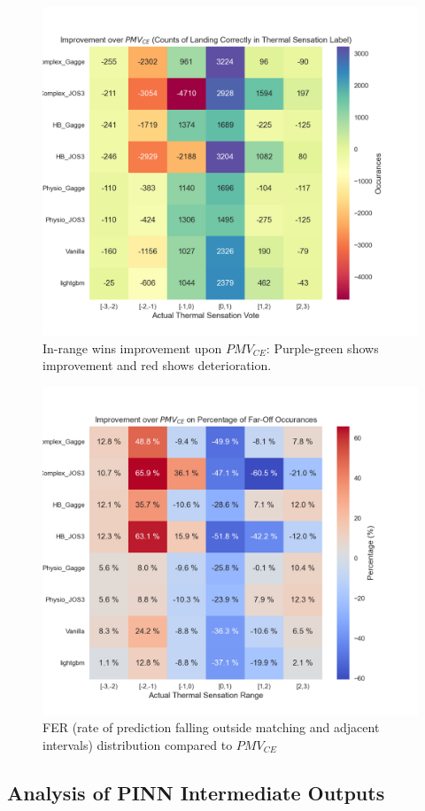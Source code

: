 \begin{figure}[htbp]
    \centering
    \includegraphics[width=0.75\linewidth]{figures/Improve_Count_PMV.png}
    \caption{In-range wins improvement upon $PMV_{CE}$: Purple-green shows improvement and red shows deterioration.}
    \label{fig:enter-label}
\end{figure}
\begin{figure}[htbp]
    \centering
    \includegraphics[width=0.75\linewidth]{figures/FOff_Mods_Perc.png}
    \caption{FER (rate of prediction falling outside matching and adjacent intervals) distribution compared to $PMV_{CE}$ }
    \label{fig:far-off}
\end{figure}

\subsection{Analysis of PINN Intermediate Outputs} 

